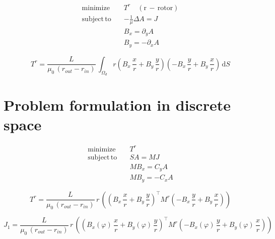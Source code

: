 \begin{align*} 
\mathrm{minimize}\quad  &  T^r \quad \mathrm{(r\,-\,rotor)} \\
\mathrm{subject \, to}\quad  & - \frac{1}{\mu} \Delta A = J \\
&  B_x = \partial_y A \\
&  B_y = - \partial_x A
\end{align*}

\begin{equation} \label{eq:43} 
T^r = \frac{L}{\mu_0\,\left(r_{out} - r_{in}\right)}\, \int_{\Omega_d} r \left(  B_x \,\frac{x}{r} + B_y \,\frac{y}{r} \right) \left( - B_x \,\frac{y}{r} + B_y \,\frac{x}{r} \right) \,\mathrm{d}S
\end{equation}

\section{Problem formulation in discrete space}

\begin{align*} 
\mathrm{minimize}\quad  &  T^r \\
\mathrm{subject \, to}\quad  &  S A = M J \\
&  M B_x = C_y A \\
&  M B_y = -C_x A 
\end{align*}


\begin{equation} \label{eq:44} 
T^r = \frac{L}{\mu_0\,\left(r_{out} - r_{in}\right)} \, r \, \left( \left(  B_x \,\frac{x}{r} + B_y \,\frac{y}{r} \right)^\top M^r \left( - B_x \,\frac{y}{r} + B_y \,\frac{x}{r} \right) \right)
\end{equation}


\begin{equation}
J_1 =\frac{L}{\mu_0\,\left(r_{out} - r_{in}\right)} \, r \, \left( \left(  B_x \left(\varphi\right) \,\frac{x}{r} + B_y \left(\varphi\right) \,\frac{y}{r} \right)^\top M^r \left( - B_x \left(\varphi\right) \,\frac{y}{r} + B_y \left(\varphi\right) \,\frac{x}{r} \right) \right)
\end{equation}

